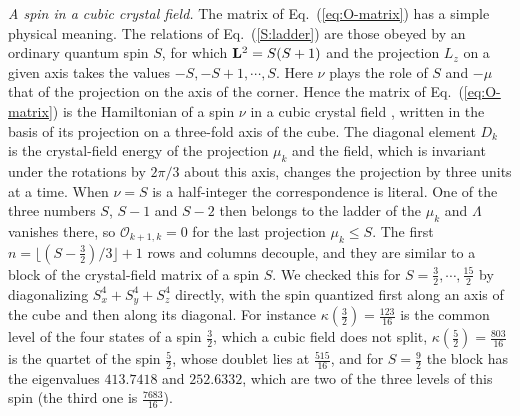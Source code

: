 \emph{A spin in a cubic crystal field.} The matrix of Eq.~(\ref{eq:O-matrix}) has a simple physical meaning. The relations of Eq.~(\ref{S:ladder}) are those obeyed by an ordinary quantum spin $S$, for which $\vb{L}^2 = S(S+1)$ and the projection $L_z$ on a given axis takes the values $-S, -S+1, \cdots, S$. Here $\nu$ plays the role of $S$ and $-\mu$ that of the projection on the axis of the corner. Hence the matrix of Eq.~(\ref{eq:O-matrix}) is the Hamiltonian of a spin $\nu$ in a cubic crystal field \cite{LLW62,AB70}, written in the basis of its projection on a three-fold axis of the cube. The diagonal element $D_k$ is the crystal-field energy of the projection $\mu_k$ and the field, which is invariant under the rotations by $2\pi/3$ about this axis, changes the projection by three units at a time. When $\nu = S$ is a half-integer the correspondence is literal. One of the three numbers $S$, $S-1$ and $S-2$ then belongs to the ladder of the $\mu_k$ and $\Lambda$ vanishes there, so $\mathcal{O}_{k+1,k} = 0$ for the last projection $\mu_k \leq S$. The first $n = \lfloor (S - \frac{3}{2})/3 \rfloor + 1$ rows and columns decouple, and they are similar to a block of the crystal-field matrix of a spin $S$. We checked this for $S = \frac{3}{2}, \cdots, \frac{15}{2}$ by diagonalizing $S_x^4 + S_y^4 + S_z^4$ directly, with the spin quantized first along an axis of the cube and then along its diagonal. For instance $\kappa(\frac{3}{2}) = \frac{123}{16}$ is the common level of the four states of a spin $\frac{3}{2}$, which a cubic field does not split, $\kappa(\frac{5}{2}) = \frac{803}{16}$ is the quartet of the spin $\frac{5}{2}$, whose doublet lies at $\frac{515}{16}$, and for $S = \frac{9}{2}$ the block has the eigenvalues $413.7418$ and $252.6332$, which are two of the three levels of this spin (the third one is $\frac{7683}{16}$).

